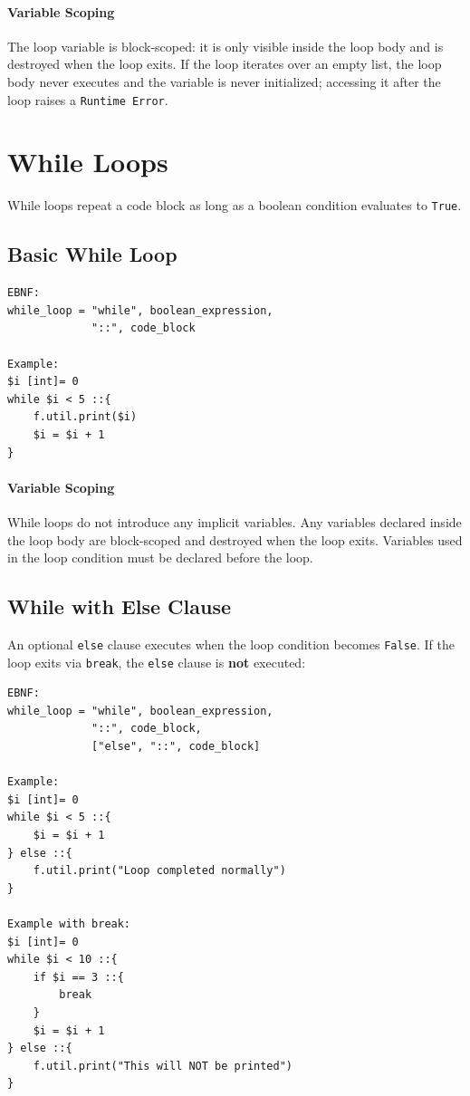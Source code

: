 \paragraph{Variable Scoping}
The loop variable is block-scoped: it is only visible inside the loop body and is destroyed when the loop exits. If the loop iterates over an empty list, the loop body never executes and the variable is never initialized; accessing it after the loop raises a \texttt{Runtime Error}.

\section{While Loops}
While loops repeat a code block as long as a boolean condition evaluates to \texttt{True}.

\subsection{Basic While Loop}
\begin{verbatim}
EBNF:
while_loop = "while", boolean_expression, 
             "::", code_block

Example:
$i [int]= 0
while $i < 5 ::{
    f.util.print($i)
    $i = $i + 1
}
\end{verbatim}

\paragraph{Variable Scoping}
While loops do not introduce any implicit variables. Any variables declared inside the loop body are block-scoped and destroyed when the loop exits. Variables used in the loop condition must be declared before the loop.

\subsection{While with Else Clause}
An optional \texttt{else} clause executes when the loop condition becomes \texttt{False}. If the loop exits via \texttt{break}, the \texttt{else} clause is \textbf{not} executed:
\begin{verbatim}
EBNF:
while_loop = "while", boolean_expression, 
             "::", code_block,
             ["else", "::", code_block]

Example:
$i [int]= 0
while $i < 5 ::{
    $i = $i + 1
} else ::{
    f.util.print("Loop completed normally")
}

Example with break:
$i [int]= 0
while $i < 10 ::{
    if $i == 3 ::{
        break
    }
    $i = $i + 1
} else ::{
    f.util.print("This will NOT be printed")
}
\end{verbatim}

